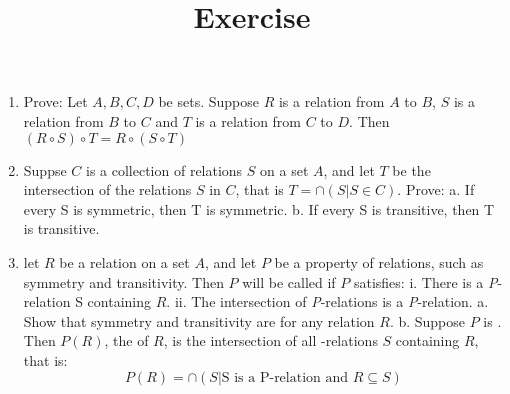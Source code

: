 \documentclass[a4paper, 12pt]{article}
\title{Exercise}
\begin{document}
\begin{enumerate}
  \item Prove: Let $A, B, C, D$ be sets. Suppose $R$ is a relation from $A$ to $B$,
  $S$ is a relation from $B$ to $C$ and $T$ is a relation from $C$ to $D$.
  Then $(R\circ S)\circ T = R\circ (S\circ T)$
  \item Suppse $C$ is a collection of relations $S$ on a set $A$,
  and let $T$ be the intersection of the relations $S$ in $C$, that is $T = \cap(S|S \in C)$.
  Prove:
  a. If every S is symmetric, then T is symmetric.
  b. If every S is transitive, then T is transitive.
  \item let $R$ be a relation on a set $A$, and let $P$ be a property of relations,
  such as symmetry and transitivity. Then $P$ will be called  if $P$ satisfies:
  i. There is a \textsl{P}-relation S containing $R$.
  ii. The intersection of \textsl{P}-relations is a \textsl{P}-relation.
  a. Show that symmetry and transitivity are  for any relation $R$.
  b. Suppose $P$ is . Then $P(R)$, the  of $R$,
  is the intersection of all -relations $S$ containing $R$, that is:
  $$
  P(R) = \cap(S | \textrm{S is a P-relation and } R \subseteq S)
  $$

\end{enumerate}
\end{document}
